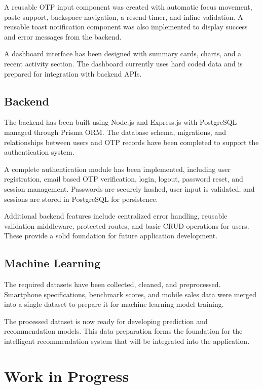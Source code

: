 \documentclass[12pt, a4paper]{report}
\numberwithin{equation}{chapter}
\begin{document}
A reusable OTP input component was created with automatic focus movement, paste support, backspace navigation, a resend timer, and inline validation. A reusable toast notification component was also implemented to display success and error messages from the backend.

A dashboard interface has been designed with summary cards, charts, and a recent activity section. The dashboard currently uses hard coded data and is prepared for integration with backend APIs.

\subsection{Backend}

The backend has been built using Node.js and Express.js with PostgreSQL managed through Prisma ORM. The database schema, migrations, and relationships between users and OTP records have been completed to support the authentication system.

A complete authentication module has been implemented, including user registration, email based OTP verification, login, logout, password reset, and session management. Passwords are securely hashed, user input is validated, and sessions are stored in PostgreSQL for persistence.

Additional backend features include centralized error handling, reusable validation middleware, protected routes, and basic CRUD operations for users. These provide a solid foundation for future application development.

\subsection{Machine Learning}

The required datasets have been collected, cleaned, and preprocessed. Smartphone specifications, benchmark scores, and mobile sales data were merged into a single dataset to prepare it for machine learning model training.

The processed dataset is now ready for developing prediction and recommendation models. This data preparation forms the foundation for the intelligent recommendation system that will be integrated into the application.


\section{Work in Progress}
\end{document}
